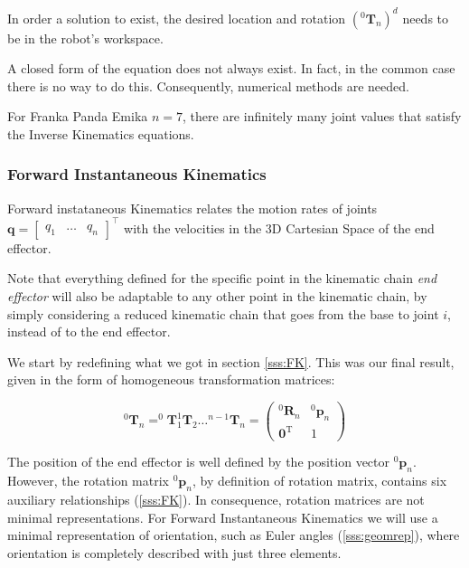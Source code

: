 In order a solution to exist, the desired location and rotation $(^{0}\mathbf{T}_{n})^{d}$ needs to be in the robot's workspace.

A closed form of the equation does not always exist. In fact, in the common case there is no way to do this. Consequently, numerical methods are needed.

For Franka Panda Emika $n = 7$, there are infinitely many joint values that satisfy the Inverse Kinematics equations.

\subsubsection{Forward Instantaneous Kinematics}

\label{sss:FIK}

Forward instataneous Kinematics relates the motion rates of joints $\mathbf{q} = \begin{bmatrix}q_{1} & \dots & q_{n}\end{bmatrix}^{\intercal}$ with the velocities in the 3D Cartesian Space of the end effector.

Note that everything defined for the specific point in the kinematic chain \textit{end effector} will also be adaptable to any other point in the kinematic chain, by simply considering a reduced kinematic chain that goes from the base to joint $i$, instead of to the end effector.

We start by redefining what we got in section \ref{sss:FK}. This was our final result, given in the form of homogeneous transformation matrices:

$$
^{0}\mathbf{T}_{n} = ^{0}\mathbf{T}_{1} ^{1}\mathbf{T}_{2} \dots ^{n-1}\mathbf{T}_{n} =
\left(\begin{array}{cc}
    ^{0} \mathbf{R}_{n} & ^{0} \boldsymbol{p}_{n} \\
    \mathbf{0}^{\mathrm{T}} & 1
\end{array}\right)
$$

The position of the end effector is well defined by the position vector $^{0} \boldsymbol{p}_{n}$. However, the rotation matrix $^{0} \boldsymbol{p}_{n}$, by definition of rotation matrix, contains six auxiliary relationships (\ref{sss:FK}). In consequence, rotation matrices are not minimal representations. For Forward Instantaneous Kinematics we will use a minimal representation of orientation, such as Euler angles (\ref{sss:geomrep}), where orientation is completely described with just three elements.

